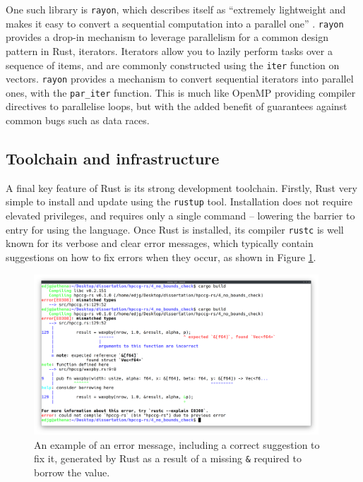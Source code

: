 One such library is \texttt{rayon}, which describes itself as ``extremely lightweight and makes it easy to convert a sequential computation into a parallel one'' \cite{RayonRust}. \texttt{rayon} provides a drop-in mechanism to leverage parallelism for a common design pattern in Rust, iterators. Iterators allow you to lazily perform tasks over a sequence of items, and are commonly constructed using the \texttt{iter} function on vectors. \texttt{rayon} provides a mechanism to convert sequential iterators into parallel ones, with the \texttt{par\_iter} function. This is much like OpenMP providing compiler directives to parallelise loops, but with the added benefit of guarantees against common bugs such as data races.


\subsection{Toolchain and infrastructure}
\label{ssec:rust-toolchain}

A final key feature of Rust is its strong development toolchain. Firstly, Rust very simple to install and update using the \texttt{rustup} tool. Installation does not require elevated privileges, and requires only a single command -- lowering the barrier to entry for using the language. Once Rust is installed, its compiler \texttt{rustc} is well known for its verbose and clear error messages, which typically contain suggestions on how to fix errors when they occur, as shown in Figure \ref{fig:rust_error_messages}.

\begin{figure}[H]
    \centering
    \includegraphics[width=0.95\textwidth]{images/2_background/rust_error_messages.png}
    \caption{An example of an error message, including a correct suggestion to fix it, generated by Rust as a result of a missing \texttt{&} required to borrow the value.}
    \label{fig:rust_error_messages}
\end{figure}

